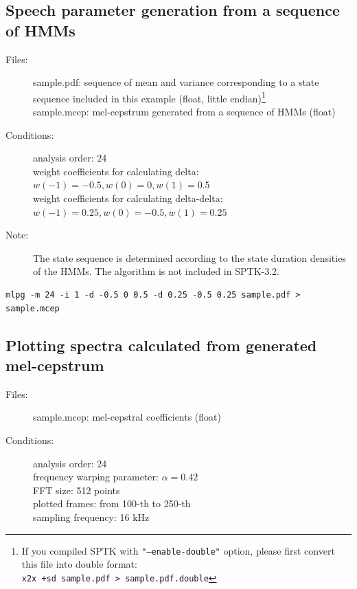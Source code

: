 \documentclass[a4paper,10pt]{article}
\begin{document}
\subsection{Speech parameter generation from a sequence of HMMs}

\begin{description}
\item[Files:]
  sample.pdf: sequence of mean and variance
              corresponding to a state sequence included in this example (float, little endian)\footnote{If you compiled SPTK with
\texttt{"--enable-double"} option, please first convert this file into double
format:\\ \texttt{x2x +sd sample.pdf > sample.pdf.double}}\\
  sample.mcep: mel-cepstrum generated from a sequence of HMMs (float)
\item[Conditions:]
  analysis order: 24\\
  weight coefficients for calculating delta: $w(-1)=-0.5,w(0)=0,w(1)=0.5$\\
  weight coefficients for calculating delta-delta: $w(-1)=0.25,w(0)=-0.5,w(1)=0.25$
\item[Note:]
  The state sequence is determined according to the state
  duration densities of the HMMs.  The algorithm is not included
  in SPTK-3.2.
\end{description}

\begin{verbatim}
mlpg -m 24 -i 1 -d -0.5 0 0.5 -d 0.25 -0.5 0.25 sample.pdf > sample.mcep
\end{verbatim}

\subsection{Plotting spectra calculated from generated mel-cepstrum}

\begin{description}
\item[Files:]
  sample.mcep: mel-cepstral coefficients (float)
\item[Conditions:]
  analysis order: 24\\
  frequency warping parameter: $\alpha = 0.42$\\
  FFT size: 512 points\\
  plotted frames: from 100-th to 250-th\\
  sampling frequency: 16 kHz
\end{description}
\end{document}
